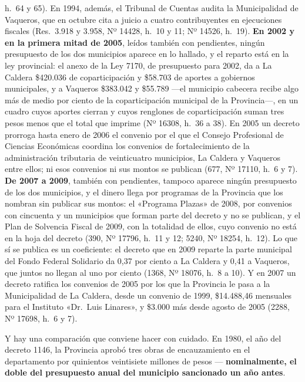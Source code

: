 h.\ 64 y 65). En 1994, además, el Tribunal de Cuentas audita la Municipalidad de Vaqueros, que en octubre cita a juicio a cuatro contribuyentes en ejecuciones fiscales (Res.\ 3.918 y 3.958, Nº 14428, h.\ 10 y 11; Nº 14526, h.\ 19). \textbf{En 2002 y en la primera mitad de 2005}, leídos también con pendientes, ningún presupuesto de los dos municipios aparece en lo hallado, y el reparto está en la ley provincial: el anexo de la Ley 7170, de presupuesto para 2002, da a La Caldera \$420.036 de coparticipación y \$58.703 de aportes a gobiernos municipales, y a Vaqueros \$383.042 y \$55.789 ---el municipio cabecera recibe algo más de medio por ciento de la coparticipación municipal de la Provincia---, en un cuadro cuyos aportes cierran y cuyos renglones de coparticipación suman tres pesos menos que el total que imprime (Nº 16308, h.\ 36 a 38). En 2005 un decreto prorroga hasta enero de 2006 el convenio por el que el Consejo Profesional de Ciencias Económicas coordina los convenios de fortalecimiento de la administración tributaria de veinticuatro municipios, La Caldera y Vaqueros entre ellos; ni esos convenios ni sus montos se publican (677, Nº 17110, h.\ 6 y 7). \textbf{De 2007 a 2009}, también con pendientes, tampoco aparece ningún presupuesto de los dos municipios, y el dinero llega por programas de la Provincia que los nombran sin publicar sus montos: el «Programa Plazas» de 2008, por convenios con cincuenta y un municipios que forman parte del decreto y no se publican, y el Plan de Solvencia Fiscal de 2009, con la totalidad de ellos, cuyo convenio no está en la hoja del decreto (390, Nº 17796, h.\ 11 y 12; 5240, Nº 18254, h.\ 12). Lo que sí se publica es un coeficiente: el decreto que en 2009 reparte la parte municipal del Fondo Federal Solidario da 0,37 por ciento a La Caldera y 0,41 a Vaqueros, que juntos no llegan al uno por ciento (1368, Nº 18076, h.\ 8 a 10). Y en 2007 un decreto ratifica los convenios de 2005 por los que la Provincia le pasa a la Municipalidad de La Caldera, desde un convenio de 1999, \$14.488,46 mensuales para el Instituto «Dr.\ Luis Linares», y \$3.000 más desde agosto de 2005 (2288, Nº 17698, h.\ 6 y 7).

Y hay una comparación que conviene hacer con cuidado. En 1980, el año del decreto 1146, la Provincia aprobó tres
obras de encauzamiento en el departamento por quinientos veintisiete millones de pesos ---
\textbf{nominalmente, el doble del presupuesto anual del municipio sancionado un año antes}.

